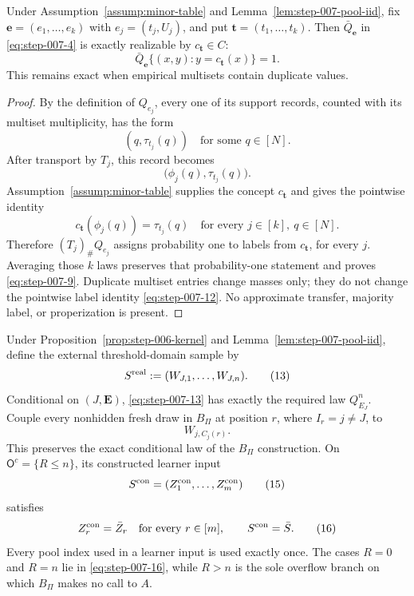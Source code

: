 \begin{proposition}
\label{prop:step-007-realizable}

Under Assumption~\ref{assump:minor-table} and
Lemma~\ref{lem:step-007-pool-iid}, fix
\(\mathbf e=(e_1,\ldots,e_k)\) with
\(e_j=(t_j,U_j)\), and put
\(\mathbf t=(t_1,\ldots,t_k)\).  Then
\(\bar Q_{\mathbf e}\) in \eqref{eq:step-007-4} is exactly realizable by
\(c_{\mathbf t}\in C\):
\[
\bar Q_{\mathbf e}
\bigl\{(x,y):y=c_{\mathbf t}(x)\bigr\}=1.
\tag{9}\label{eq:step-007-9}
\]
This remains exact when empirical multisets contain duplicate values.

\end{proposition}

\begin{proof}

By the definition of \(Q_{e_j}\), every one of its support records,
counted with its multiset multiplicity, has the form
\[
(q,\tau_{t_j}(q))
\quad\text{for some }q\in[N].
\tag{10}\label{eq:step-007-10}
\]
After transport by \(T_j\), this record becomes
\[
\bigl(\phi_j(q),\tau_{t_j}(q)\bigr).
\tag{11}\label{eq:step-007-11}
\]
Assumption~\ref{assump:minor-table} supplies the concept
\(c_{\mathbf t}\) and gives the pointwise identity
\[
c_{\mathbf t}(\phi_j(q))=\tau_{t_j}(q)
\quad
\text{for every }j\in[k],\ q\in[N].
\tag{12}\label{eq:step-007-12}
\]
Therefore \((T_j)_\#Q_{e_j}\) assigns probability one to labels from
\(c_{\mathbf t}\), for every \(j\).  Averaging those \(k\) laws
preserves that probability-one statement and proves \eqref{eq:step-007-9}.  Duplicate
multiset entries change masses only; they do not change the
pointwise label identity \eqref{eq:step-007-12}.  No approximate transfer, majority
label, or properization is present.

\end{proof}


\begin{lemma}
\label{lem:step-007-record-coupling}

Under Proposition~\ref{prop:step-006-kernel} and
Lemma~\ref{lem:step-007-pool-iid}, define the external threshold-domain
sample by
\[
S^{\rm real}
:=(W_{J,1},\ldots,W_{J,n}).
\tag{13}\label{eq:step-007-13}
\]
Conditional on \((J,\mathbf E)\), \eqref{eq:step-007-13} has exactly the required law
\(Q_{E_J}^n\).  Couple every nonhidden fresh draw in \(B_\Pi\) at
position \(r\), where \(I_r=j\ne J\), to
\[
W_{j,C_j(r)}.
\tag{14}\label{eq:step-007-14}
\]
This preserves the exact conditional law of the 
\(B_\Pi\) construction.  On
\(\mathsf O^c=\{R\le n\}\), its constructed learner input
\[
S^{\rm con}=(Z^{\rm con}_1,\ldots,Z^{\rm con}_m)
\tag{15}\label{eq:step-007-15}
\]
satisfies
\[
Z^{\rm con}_r=\bar Z_r
\quad\text{for every }r\in[m],
\qquad
S^{\rm con}=\bar S.
\tag{16}\label{eq:step-007-16}
\]
Every pool index used in a learner input is used exactly once.  The
cases \(R=0\) and \(R=n\) lie in \eqref{eq:step-007-16}, while \(R>n\) is the sole
overflow branch on which \(B_\Pi\) makes no call to \(A\).

\end{lemma}


